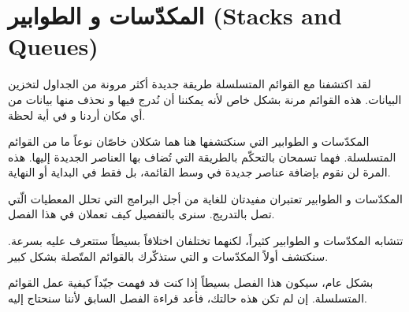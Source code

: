 \chapter{المكدّسات و الطوابير (\textenglish{Stacks and Queues})}

لقد اكتشفنا مع القوائم المتسلسلة طريقة جديدة أكثر مرونة من الجداول لتخزين البيانات. هذه القوائم مرنة بشكل خاص لأنه يمكننا أن نُدرج فيها و نحذف منها بيانات من أي مكان أردنا و في أية لحظة.

المكدّسات و الطوابير التي سنكتشفها هنا هما شكلان خاصّان نوعاً ما من القوائم المتسلسلة. فهما تسمحان بالتحكّم بالطريقة التي تُضاف بها العناصر الجديدة إليها. هذه المرة لن نقوم بإضافة عناصر جديدة في وسط القائمة، بل فقط في البداية أو النهاية. 

المكدّسات و الطوابير تعتبران مفيدتان للغاية من أجل البرامج التي تحلل المعطيات الّتي تصل بالتدريج. سنرى بالتفصيل كيف تعملان في هذا الفصل.

تتشابه المكدّسات و الطوابير كثيراً، لكنهما تختلفان اختلافاً بسيطاً ستتعرف عليه بسرعة. سنكتشف أولاً المكدّسات و التي ستذكّرك بالقوائم المتّصلة بشكل كبير. 

بشكل عام، سيكون هذا الفصل بسيطاً إذا كنت قد فهمت جيّداً كيفية عمل القوائم المتسلسلة. إن لم تكن هذه حالتك، فأعد قراءة الفصل السابق لأننا سنحتاج إليه.
